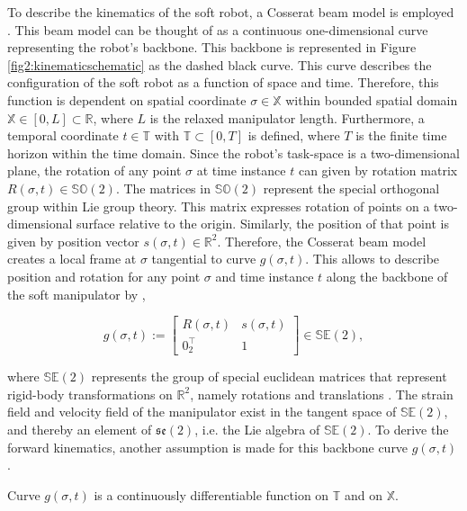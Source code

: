To describe the kinematics of the soft robot, a Cosserat beam model is employed \cite{Boyer2019}. This beam model can be thought of as a continuous one-dimensional curve representing the robot's backbone. This backbone is represented in Figure \ref{fig2:kinematicschematic} as the dashed black curve. This curve describes the configuration of the soft robot as a function of space and time. Therefore, this function is dependent on spatial coordinate $\sigma \in \mathbb{X}$ within bounded spatial domain $\mathbb{X} \in [0,L] \subset \mathbb{R}$, where $L$ is the relaxed manipulator length. Furthermore, a temporal coordinate $t \in \mathbb{T}$ with $\mathbb{T} \subset [0,T]$ is defined, where $T$ is the finite time horizon within the time domain. Since the robot's task-space is a two-dimensional plane, the rotation of any point $\sigma$ at time instance $t$ can given by rotation matrix $R(\sigma,t) \in \mathbb{SO}(2)$. The matrices in $\mathbb{SO}(2)$ represent the special orthogonal group within Lie group theory. This matrix expresses rotation of points on a two-dimensional surface relative to the origin. Similarly, the position of that point is given by position vector $s(\sigma,t) \in \mathbb{R}^2$. Therefore, the Cosserat beam model creates a local frame at $\sigma$ tangential to curve $g(\sigma,t)$. This allows to describe position and rotation for any point $\sigma$ and time instance $t$ along the backbone of the soft manipulator by \cite{Caasenbrood2020},


\begin{equation}
    g(\sigma,t) := \begin{bmatrix}  R(\sigma,t) & s(\sigma,t) \\ 0_2^\top & 1 \end{bmatrix} \in \mathbb{SE}(2),
    \label{eq2:g}
\end{equation}

where $\mathbb{SE}(2)$ represents the group of special euclidean matrices that represent rigid-body transformations on $\mathbb{R}^2$, namely rotations and translations \cite{Sola2018}. The strain field and velocity field of the manipulator exist in the tangent space of $\mathbb{SE}(2)$, and thereby an element of $\mathfrak{se}(2)$, i.e. the Lie algebra of $\mathbb{SE}(2)$. To derive the forward kinematics, another assumption is made for this backbone curve $g(\sigma,t)$.

\begin{theorem}
Curve  $g(\sigma,t)$ is a continuously differentiable function on $\mathbb{T}$ and on $\mathbb{X}$.
\end{theorem}

